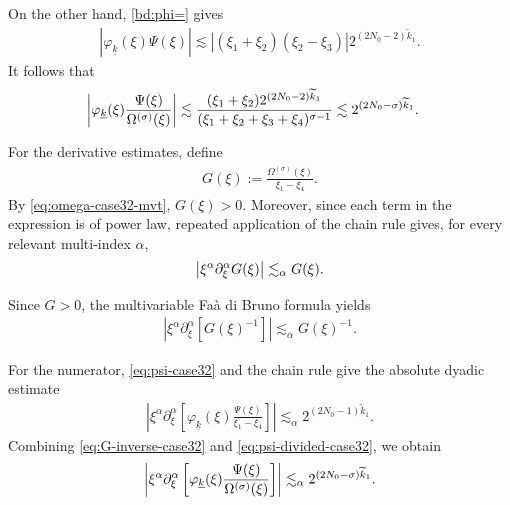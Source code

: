\documentclass[UTF-8,reqno]{amsart}
\numberwithin{equation}{section}
\theoremstyle{definition}
\begin{document}
On the other hand, \eqref{bd:phi=} gives
\begin{align}
\left|
\varphi_{\underline{k}}(\xi)\Psi(\xi)
\right|
\lesssim
|(\xi_1+\xi_2)(\xi_2-\xi_3)|
2^{(2N_0-2)\widetilde{k}_1}.
\label{eq:psi-case32}
\end{align}  It follows that 
\begin{align}
\left|
\varphi_{\underline{k}}(\xi)
\frac{\Psi(\xi)}{\Omega^{(\sigma)}(\xi)}
\right|
&\lesssim
\frac{
(\xi_1+\xi_2)
2^{(2N_0-2)\widetilde{k}_1}
}{
(\xi_1+\xi_2+\xi_3+\xi_4)^{\sigma-1}
} \lesssim
2^{(2N_0-\sigma)\widetilde{k}_1}.\notag
\end{align} 

For the derivative estimates, define
\begin{align*}
G(\xi)
:=
\frac{\Omega^{(\sigma)}(\xi)}{\xi_1-\xi_4}.
\end{align*}
By \eqref{eq:omega-case32-mvt}, $G(\xi)>0$. Moreover, since each term  in the expression is of power law, repeated
application of the chain rule gives, for every relevant multi-index
$\alpha$,
\begin{align}
\left|
\xi^\alpha\partial_\xi^\alpha G(\xi)
\right|
\lesssim_\alpha
G(\xi).\notag
\end{align} 

Since $G>0$, the multivariable Fa\`a di Bruno formula yields
\begin{align}
\left|
\xi^\alpha\partial_\xi^\alpha
\left[G(\xi)^{-1}\right]
\right|
\lesssim_\alpha
G(\xi)^{-1}.
\label{eq:G-inverse-case32}
\end{align} 

For the numerator, \eqref{eq:psi-case32} and the chain rule give the
absolute dyadic estimate
\begin{align}
\left|
\xi^\alpha\partial_\xi^\alpha
\left[
\varphi_{\underline k}(\xi)
\frac{\Psi(\xi)}{\xi_1-\xi_4}
\right]
\right|
\lesssim_\alpha
2^{(2N_0-1)\widetilde k_1}.
\label{eq:psi-divided-case32}
\end{align}
Combining \eqref{eq:G-inverse-case32}  and
\eqref{eq:psi-divided-case32}, we obtain
\begin{align}
\left|
\xi^\alpha\partial_\xi^\alpha
\left[
\varphi_{\underline{k}}(\xi)
\frac{\Psi(\xi)}{\Omega^{(\sigma)}(\xi)}
\right]
\right|
\lesssim_\alpha
2^{(2N_0-\sigma)\widetilde{k}_1}.\notag
\end{align} 
\end{document}
